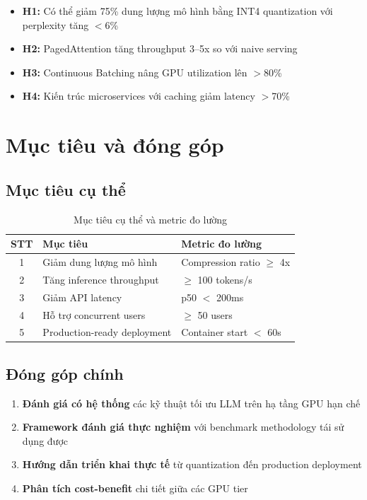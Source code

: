 \documentclass[12pt,a4paper]{report}
\begin{document}
\begin{itemize}
  \item \textbf{H1:} Có thể giảm 75\% dung lượng mô hình bằng INT4 quantization với perplexity tăng $<$6\%
  \item \textbf{H2:} PagedAttention tăng throughput 3--5x so với naive serving
  \item \textbf{H3:} Continuous Batching nâng GPU utilization lên $>$80\%
  \item \textbf{H4:} Kiến trúc microservices với caching giảm latency $>$70\%
\end{itemize}

\section{Mục tiêu và đóng góp}

\subsection{Mục tiêu cụ thể}

\begin{table}[h]
\centering
\caption{Mục tiêu cụ thể và metric đo lường}
\label{tab:objectives}
\begin{tabular}{cll}
\toprule
\textbf{STT} & \textbf{Mục tiêu} & \textbf{Metric đo lường} \\
\midrule
1 & Giảm dung lượng mô hình & Compression ratio $\geq$ 4x \\
2 & Tăng inference throughput & $\geq$ 100 tokens/s \\
3 & Giảm API latency & p50 $<$ 200ms \\
4 & Hỗ trợ concurrent users & $\geq$ 50 users \\
5 & Production-ready deployment & Container start $<$ 60s \\
\bottomrule
\end{tabular}
\end{table}

\subsection{Đóng góp chính}

\begin{enumerate}
  \item \textbf{Đánh giá có hệ thống} các kỹ thuật tối ưu LLM trên hạ tầng GPU hạn chế
  \item \textbf{Framework đánh giá thực nghiệm} với benchmark methodology tái sử dụng được
  \item \textbf{Hướng dẫn triển khai thực tế} từ quantization đến production deployment
  \item \textbf{Phân tích cost-benefit} chi tiết giữa các GPU tier
\end{enumerate}
\end{document}
